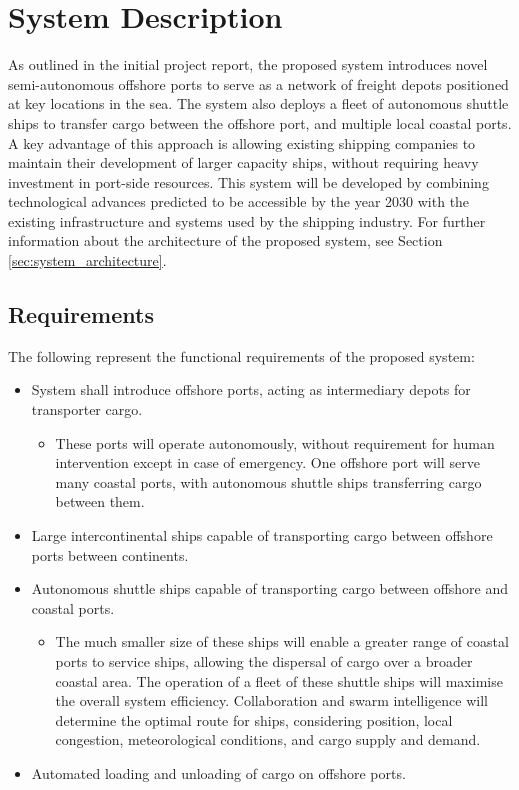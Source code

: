 \section{System Description}

As outlined in the initial project report, the proposed system introduces novel semi-autonomous offshore ports to serve as a network of freight depots positioned at key locations in the sea. The system also deploys a fleet of autonomous shuttle ships to transfer cargo between the offshore port, and multiple local coastal ports. A key advantage of this approach is allowing existing shipping companies to maintain their development of larger capacity ships, without requiring heavy investment in port-side resources. This system will be developed by combining technological advances predicted to be accessible by the year 2030 with the existing infrastructure and systems used by the shipping industry. For further information about the architecture of the proposed system, see Section \ref{sec:system_architecture}.

\subsection{Requirements}
\noindent The following represent the functional requirements of the proposed system:

\begin{itemize}
	\item System shall introduce offshore ports, acting as intermediary depots for transporter cargo.
	\begin{itemize}
		\item These ports will operate autonomously, without requirement for human intervention except in case of emergency. One offshore port will serve many coastal ports, with autonomous shuttle ships transferring cargo between them. 
	\end{itemize}
\item Large intercontinental ships capable of transporting cargo between offshore ports between continents.
\item Autonomous shuttle ships capable of transporting cargo between offshore and coastal ports.
\begin{itemize}
	\item The much smaller size of these ships will enable a greater range of coastal ports to service ships, allowing the dispersal of cargo over a broader coastal area. The operation of a fleet of these shuttle ships will maximise the overall system efficiency. Collaboration and swarm intelligence will determine the optimal route for ships, considering position, local congestion, meteorological conditions, and cargo supply and demand.
\end{itemize}
\item Automated loading and unloading of cargo on offshore ports.
\end{itemize}

